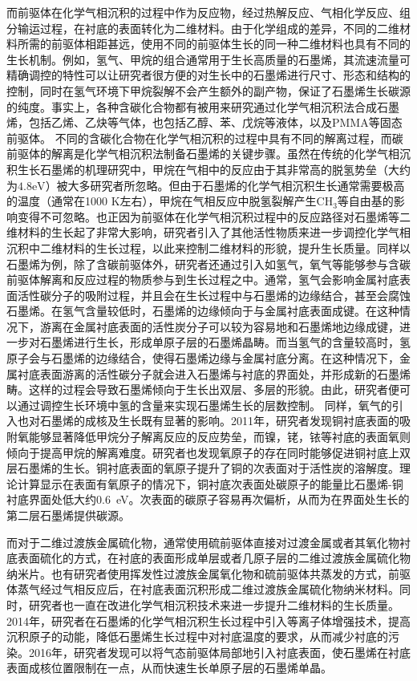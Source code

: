     而前驱体在化学气相沉积的过程中作为反应物，经过热解反应、气相化学反应、组分输运过程，在衬底的表面转化为二维材料。由于化学组成的差异，不同的二维材料所需的前驱体相距甚远，使用不同的前驱体生长的同一种二维材料也具有不同的生长机制。例如，氢气、甲烷的组合通常用于生长高质量的石墨烯，其流速流量可精确调控的特性可以让研究者很方便的对生长中的石墨烯进行尺寸、形态和结构的控制，同时在氢气环境下甲烷裂解不会产生额外的副产物，保证了石墨烯生长碳源的纯度。事实上，各种含碳化合物都有被用来研究通过化学气相沉积法合成石墨烯，包括乙烯、乙炔等气体，也包括乙醇、苯、戊烷等液体，以及PMMA等固态前驱体。%
    不同的含碳化合物在化学气相沉积的过程中具有不同的解离过程，而碳前驱体的解离是化学气相沉积法制备石墨烯的关键步骤。虽然在传统的化学气相沉积生长石墨烯的机理研究中，甲烷在气相中的反应由于其非常高的脱氢势垒（大约为$4.8\si{\electronvolt}$）被大多研究者所忽略。但由于石墨烯的化学气相沉积生长通常需要极高的温度（通常在1000 K左右），甲烷在气相反应中脱氢裂解产生CH$_3$等自由基的影响变得不可忽略。也正因为前驱体在化学气相沉积过程中的反应路径对石墨烯等二维材料的生长起了非常大影响，研究者引入了其他活性物质来进一步调控化学气相沉积中二维材料的生长过程，以此来控制二维材料的形貌，提升生长质量。同样以石墨烯为例，除了含碳前驱体外，研究者还通过引入如氢气，氧气等能够参与含碳前驱体解离和反应过程的物质参与到生长过程之中。通常，氢气会影响金属衬底表面活性碳分子的吸附过程，并且会在生长过程中与石墨烯的边缘结合，甚至会腐蚀石墨烯。在氢气含量较低时，石墨烯的边缘倾向于与金属衬底表面成键。在这种情况下，游离在金属衬底表面的活性炭分子可以较为容易地和石墨烯地边缘成键，进一步对石墨烯进行生长，形成单原子层的石墨烯晶畴。而当氢气的含量较高时，氢原子会与石墨烯的边缘结合，使得石墨烯边缘与金属衬底分离。在这种情况下，金属衬底表面游离的活性碳分子就会进入石墨烯与衬底的界面处，并形成新的石墨烯畴。这样的过程会导致石墨烯倾向于生长出双层、多层的形貌。由此，研究者便可以通过调控生长环境中氢的含量来实现石墨烯生长的层数控制。%
    同样，氧气的引入也对石墨烯的成核及生长既有显著的影响。2011年，研究者发现铜衬底表面的吸附氧能够显著降低甲烷分子解离反应的反应势垒，而镍，铑，铱等衬底的表面氧则倾向于提高甲烷的解离难度。研究者也发现氧原子的存在同时能够促进铜衬底上双层石墨烯的生长。铜衬底表面的氧原子提升了铜的次表面对于活性炭的溶解度。理论计算显示在表面有氧原子的情况下，铜衬底次表面处碳原子的能量比石墨烯-铜衬底界面处低大约\SI{0.6}{\electronvolt}。次表面的碳原子容易再次偏析，从而为在界面处生长的第二层石墨烯提供碳源。

    而对于二维过渡族金属硫化物，通常使用硫前驱体直接对过渡金属或者其氧化物衬底表面硫化的方式，在衬底的表面形成单层或者几原子层的二维过渡族金属硫化物纳米片。也有研究者使用挥发性过渡族金属氧化物和硫前驱体共蒸发的方式，前驱体蒸气经过气相反应后，在衬底表面沉积形成二维过渡族金属硫化物纳米材料。同时，研究者也一直在改进化学气相沉积技术来进一步提升二维材料的生长质量。2014年，研究者在石墨烯的化学气相沉积生长过程中引入等离子体增强技术，提高沉积原子的动能，降低石墨烯生长过程中对衬底温度的要求，从而减少衬底的污染。2016年，研究者发现可以将气态前驱体局部地引入衬底表面，使石墨烯在衬底表面成核位置限制在一点，从而快速生长单原子层的石墨烯单晶。

